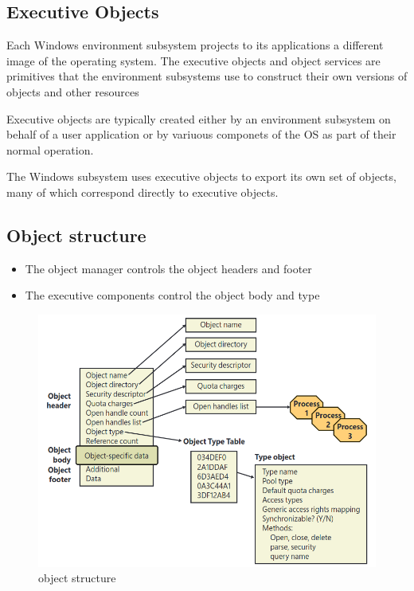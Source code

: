\subsection{Executive Objects}

Each Windows environment subsystem projects to its applications a different image of the operating
system. The executive objects and object services are primitives that the environment subsystems use
to construct their own versions of objects and other resources

Executive objects are typically created either by an environment subsystem on behalf of a user application or by variuous componets of the OS as part of their normal operation.

The Windows subsystem uses executive objects to export its own set of objects, many of which correspond directly to executive objects.


\subsection{Object structure}

\begin{itemize}
    \item The object manager controls the object headers and footer
    \item The executive components control the object body and type
\end{itemize}

\begin{figure}[!ht]
    \includegraphics[width=\linewidth]{knowledge/internals/images/obj_structure.png}
    \caption{object structure}
    \label{fig:windows_object_structure}
\end{figure}

